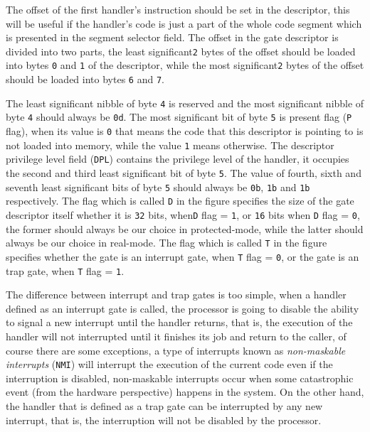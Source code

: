 The offset of the first handler's instruction should be set in the
descriptor, this will be useful if the handler's code is just a part of
the whole code segment which is presented in the segment selector field.
The offset in the gate descriptor is divided into two parts, the least
significant\lstinline!2! bytes of the offset should be loaded into bytes
\lstinline!0! and \lstinline!1! of the descriptor, while the most
significant\lstinline!2! bytes of the offset should be loaded into bytes
\lstinline!6! and \lstinline!7!.

The least significant nibble of byte \lstinline!4! is reserved and the
most significant nibble of byte \lstinline!4! should always be
\lstinline!0d!. The most significant bit of byte \lstinline!5! is
present flag (\lstinline!P! flag), when its value is \lstinline!0! that
means the code that this descriptor is pointing to is not loaded into
memory, while the value \lstinline!1! means otherwise. The descriptor
privilege level field (\lstinline!DPL!) contains the privilege level of
the handler, it occupies the second and third least significant bit of
byte \lstinline!5!. The value of fourth, sixth and seventh least
significant bits of byte \lstinline!5! should always be \lstinline!0b!,
\lstinline!1b! and \lstinline!1b! respectively. The flag which is called
\lstinline!D! in the figure specifies the size of the gate descriptor
itself whether it is \lstinline!32! bits, when\lstinline!D! flag =
\lstinline!1!, or \lstinline!16! bits when \lstinline!D! flag =
\lstinline!0!, the former should always be our choice in protected-mode,
while the latter should always be our choice in real-mode. The flag
which is called \lstinline!T! in the figure specifies whether the gate
is an interrupt gate, when \lstinline!T! flag = \lstinline!0!, or the
gate is an trap gate, when \lstinline!T! flag = \lstinline!1!.

The difference between interrupt and trap gates is too simple, when a
handler defined as an interrupt gate is called, the processor is going
to disable the ability to signal a new interrupt until the handler
returns, that is, the execution of the handler will not interrupted
until it finishes its job and return to the caller, of course there are
some exceptions, a type of interrupts known as \emph{non-maskable
interrupts} (\lstinline!NMI!) will interrupt the execution of the
current code even if the interruption is disabled, non-maskable
interrupts occur when some catastrophic event (from the hardware
perspective) happens in the system. On the other hand, the handler that
is defined as a trap gate can be interrupted by any new interrupt, that
is, the interruption will not be disabled by the processor.


